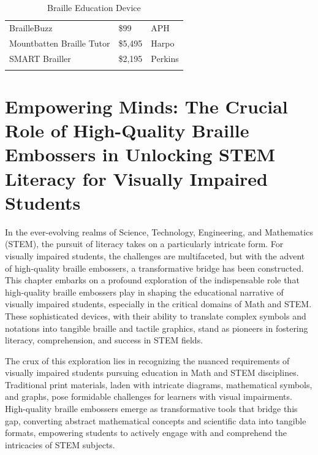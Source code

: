 \documentclass[14pt,letterpaper,twoside]{extreport}
\begin{document}
\begin{flushleft}
\begin{longtable}[]{@{}
		>{\raggedright\arraybackslash}m{}
		>{\raggedright\arraybackslash}m{}
		>{\raggedright\arraybackslash}b{}@{}
		}
		BrailleBuzz                                               & \$99                                                                  & APH                         \\[2.5em]
		Mountbatten Braille Tutor                                 & \$5,495                                                               & Harpo                       \\[2.5em]
		SMART Brailler                                            & \$2,195                                                               & Perkins                     \\[2.5em]\hline
		\caption[Braille Education Device]{Braille Education Device}
	\end{longtable}  \end{flushleft}
 
\pagebreak \hypertarget{generation}{%
	\chapter[Empowering Minds: The Crucial Role of High-Quality Braille Embossers in Unlocking STEM Literacy for Visually Impaired Students]{Empowering Minds: The Crucial Role of High-Quality Braille Embossers in Unlocking STEM Literacy for Visually Impaired Students}\label{generation}}
In the ever-evolving realms of Science, Technology, Engineering, and Mathematics (STEM), the pursuit of literacy takes on a particularly intricate form. For visually impaired students, the challenges are multifaceted, but with the advent of high-quality braille embossers, a transformative bridge has been constructed. This chapter embarks on a profound exploration of the indispensable role that high-quality braille embossers play in shaping the educational narrative of visually impaired students, especially in the critical domains of Math and STEM. These sophisticated devices, with their ability to translate complex symbols and notations into tangible braille and tactile graphics, stand as pioneers in fostering literacy, comprehension, and success in STEM fields.

The crux of this exploration lies in recognizing the nuanced requirements of visually impaired students pursuing education in Math and STEM disciplines. Traditional print materials, laden with intricate diagrams, mathematical symbols, and graphs, pose formidable challenges for learners with visual impairments. High-quality braille embossers emerge as transformative tools that bridge this gap, converting abstract mathematical concepts and scientific data into tangible formats, empowering students to actively engage with and comprehend the intricacies of STEM subjects.
\end{document}
